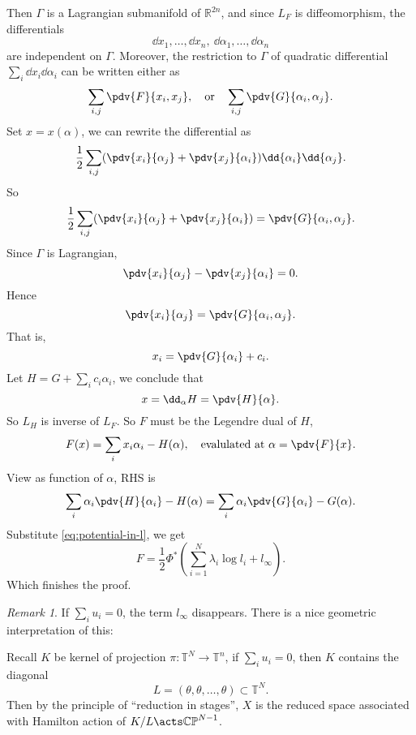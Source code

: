 \documentclass[12pt]{article}
\theoremstyle{plain}\newtheorem{theorem}{Theorem}
\theoremstyle{definition}\newtheorem{definition}[theorem]{Definition}
\theoremstyle{definition}\newtheorem{example}[theorem]{Example}
\theoremstyle{plain}\newtheorem{axiom}[theorem]{Axiom}
\theoremstyle{plain}\newtheorem{assertion}[theorem]{Assertion}
\theoremstyle{plain}\newtheorem{corollary}[theorem]{Corollary}
\theoremstyle{plain}\newtheorem{lemma}[theorem]{Lemma}
\theoremstyle{plain}\newtheorem{proposition}[theorem]{Proposition}
\theoremstyle{plain}\newtheorem{prop}[theorem]{Proposition}
\theoremstyle{plain}\newtheorem{conjecture}[theorem]{Conjecture}
\theoremstyle{plain}\newtheorem{conj}[theorem]{Conjecture}
\theoremstyle{plain}\newtheorem{problem}[theorem]{Problem}
\theoremstyle{remark}\newtheorem{notation}[theorem]{Notation}
\theoremstyle{definition}\newtheorem*{question}{Question}
\theoremstyle{definition}\newtheorem*{answer}{Answer}
\theoremstyle{definition}\newtheorem*{goal}{Goal}
\theoremstyle{plain}\newtheorem*{application}{Application}
\theoremstyle{plain}\newtheorem*{exercise}{Exercise}
\theoremstyle{remark}\newtheorem*{remark}{Remark}
\theoremstyle{remark}\newtheorem*{note}{\small{Note}}
\numberwithin{equation}{section}
\numberwithin{theorem}{section}
\numberwithin{figure}{section}
\begin{document}
Then \(\Gamma\) is a Lagrangian submanifold of \(\mathbb{R}^{2n}\), and since \(L_F\)
is diffeomorphism, the differentials \[
    \dd{x_1},\ldots,\dd{x_n},\ \dd{\alpha_1},\ldots,\dd{\alpha_n}
\] are independent on \(\Gamma\). Moreover, the restriction to \(\Gamma\) of
quadratic differential \(\sum_i \dd{x_i}\dd{\alpha_i}\) can be written either as \[
    \sum_{i,j}\pdv{F}{x_i,x_j},\quad\text{or}\quad
    \sum_{i,j}\pdv{G}{\alpha_i,\alpha_j}
.\] Set \(x=x(\alpha)\), we can rewrite the differential as \[
    \frac{1}{2}\sum_{i,j}(\pdv{x_i}{\alpha_j}+\pdv{x_j}{\alpha_i})
    \dd{\alpha_i}\dd{\alpha_j}
.\] So \[
    \frac{1}{2}\sum_{i,j}(\pdv{x_i}{\alpha_j}+\pdv{x_j}{\alpha_i})
    =\pdv{G}{\alpha_i,\alpha_j}
.\] Since \(\Gamma\) is Lagrangian, \[
    \pdv{x_i}{\alpha_j}-\pdv{x_j}{\alpha_i}=0
.\] Hence \[
    \pdv{x_i}{\alpha_j}=\pdv{G}{\alpha_i,\alpha_j}
.\] That is, \[
    x_i=\pdv{G}{\alpha_i}+c_i
.\] Let \(H=G+\sum_i c_i \alpha_i\), we conclude that \[
    x=\dd_\alpha H=\pdv{H}{\alpha}
.\] So \(L_H\) is inverse of \(L_F\). So \(F\) must be the Legendre dual of \(H\),
\ie\ \[
    F(x)=\sum_i x_i \alpha_i-H(\alpha),\quad \text{evalulated at }
    \alpha=\pdv{F}{x}
.\] View as function of \(\alpha\), RHS is \[
    \sum_i \alpha_i \pdv{H}{\alpha_i}-H(\alpha)
    = \sum_i \alpha_i \pdv{G}{\alpha_i}-G(\alpha)
.\] Substitute \cref{eq:potential-in-l}, we get 
\begin{equation}\label{eq:F-in-G}
    F=\frac{1}{2}\Phi^*\left(\sum_{i=1}^N \lambda_i \log l_i+l_\infty\right)
.\end{equation}
Which finishes the proof.

\begin{remark}
    If \(\sum_i u_i=0\), the term \(l_\infty\) disappears. There is a nice geometric
    interpretation of this:
    
    Recall \(K\) be kernel of projection \(\pi\colon \mathbb{T}^N\to \mathbb{T}^n\),
    if \(\sum_i u_i=0\), then \(K\) contains the diagonal \[
        L=(\theta,\theta,\ldots,\theta)\subset \mathbb{T}^N
    .\] Then by the principle of ``reduction in stages'', \(X\) is the reduced
    space associated with Hamilton action of \(K/L\acts \mathbb{CP}^{N-1}\).
\end{remark}
\end{document}

